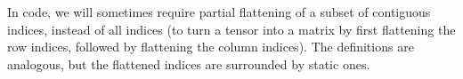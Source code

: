 In code, we will sometimes require partial flattening of a subset of contiguous indices, instead of all indices (\eg to turn a tensor into a matrix by first flattening the row indices, followed by flattening the column indices).
The definitions are analogous, but the flattened indices are surrounded by static ones.
